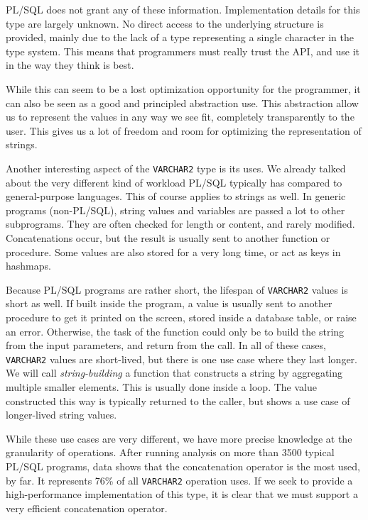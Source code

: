 \documentclass[twoside,11pt,a4paper]{article}
\newcommand{\pls}[1]{\small\texttt{#1}\normalsize}
\newcommand{\plstype}[1]{\pls{#1}}
\newcommand{\varchar}{\plstype{VARCHAR2}}
\begin{document}
PL/SQL does not grant any of these information. Implementation details for this type are largely unknown. No direct access to the underlying structure is provided, mainly due to the lack of a type representing a single character in the type system. This means that programmers must really trust the API, and use it in the way they think is best. 

While this can seem to be a lost optimization opportunity for the programmer, it can also be seen as a good and principled abstraction use. This abstraction allow us to represent the values in any way we see fit, completely transparently to the user. This gives us a lot of freedom and room for optimizing the representation of strings.

Another interesting aspect of the \varchar{} type is its uses. We already talked about the very different kind of workload PL/SQL typically has compared to general-purpose languages. This of course applies to strings as well. In generic programs (non-PL/SQL), string values and variables are passed a lot to other subprograms. They are often checked for length or content, and rarely modified. Concatenations occur, but the result is usually sent to another function or procedure. Some values are also stored for a very long time, or act as keys in hashmaps.

Because PL/SQL programs are rather short, the lifespan of \varchar{} values is short as well. If built inside the program, a value is usually sent to another procedure to get it printed on the screen, stored inside a database table, or raise an error. Otherwise, the task of the function could only be to build the string from the input parameters, and return from the call. In all of these cases, \varchar{} values are short-lived, but there is one use case where they last longer. We will call \textit{string-building} a function that constructs a string by aggregating multiple smaller elements. This is usually done inside a loop. The value constructed this way is typically returned to the caller, but shows a use case of longer-lived string values.


While these use cases are very different, we have more precise knowledge at the granularity of operations. After running analysis on more than 3500 typical PL/SQL programs, data shows that the concatenation operator is the most used, by far. It represents 76\% of all \varchar{} operation uses. If we seek to provide a high-performance implementation of this type, it is clear that we must support a very efficient concatenation operator.
\end{document}

